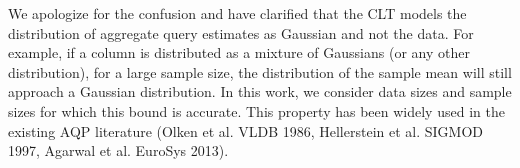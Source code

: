We apologize for the confusion and have clarified that the CLT models the distribution of aggregate query estimates as Gaussian and not the data. For example, if a column is distributed as a mixture of Gaussians (or any other distribution), for a large sample size, the distribution of the sample mean will still approach a Gaussian distribution. In this work, we consider data sizes and sample sizes for which this bound is accurate. This property has been widely used in the existing AQP literature (Olken et al. VLDB 1986, Hellerstein et al. SIGMOD 1997, Agarwal et al. EuroSys 2013). 































































































 


